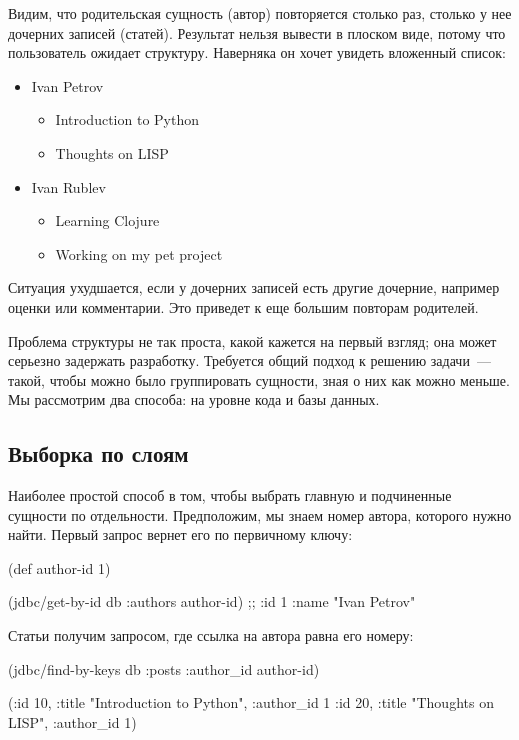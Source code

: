 Видим, что родительская сущность (автор) повторяется столько раз, столько у нее дочерних записей (статей). Результат нельзя вывести в плоском виде, потому что пользователь ожидает структуру. Наверняка он хочет увидеть вложенный список:

\begin{itemize}
\item
  Ivan Petrov
  \begin{itemize}
    \item
      Introduction to Python
    \item
      Thoughts on LISP
  \end{itemize}
\item
  Ivan Rublev
  \begin{itemize}
    \item
      Learning Clojure
    \item
      Working on my pet project
  \end{itemize}
\end{itemize}

Ситуация ухудшается, если у дочерних записей есть другие дочерние, например оценки или комментарии. Это приведет к еще большим повторам родителей.

Проблема структуры не так проста, какой кажется на первый взгляд; она может серьезно задержать разработку. Требуется общий подход к решению задачи~--- такой, чтобы можно было группировать сущности, зная о них как можно меньше. Мы рассмотрим два способа: на уровне кода и базы данных.

\subsection{Выборка по слоям}

Наиболее простой способ в том, чтобы выбрать главную и подчиненные сущности по отдельности. Предположим, мы знаем номер автора, которого нужно найти. Первый запрос вернет его по первичному ключу:

\begin{english}
  \begin{clojure}
(def author-id 1)

(jdbc/get-by-id db :authors author-id)
;; {:id 1 :name "Ivan Petrov"}
  \end{clojure}
\end{english}

Статьи получим запросом, где ссылка на автора равна его номеру:

\begin{english}
  \begin{clojure}
(jdbc/find-by-keys db :posts {:author_id author-id})

({:id 10, :title "Introduction to Python", :author_id 1}
 {:id 20, :title "Thoughts on LISP", :author_id 1})
  \end{clojure}
\end{english}

